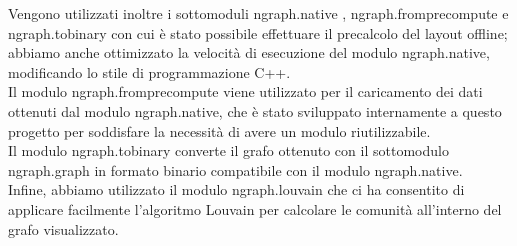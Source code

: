 Vengono utilizzati inoltre i sottomoduli ngraph.native \cite{ngraph.native}, ngraph.fromprecompute \cite{ngraph.fromprecompute} e ngraph.tobinary \cite{ngraph.tobinary} con cui è stato possibile effettuare il precalcolo del layout offline; abbiamo anche ottimizzato la velocità di esecuzione del modulo ngraph.native, modificando lo stile di programmazione C++.\\
Il modulo ngraph.fromprecompute viene utilizzato per il caricamento dei dati ottenuti dal modulo ngraph.native, che è stato  sviluppato internamente a questo progetto per soddisfare  la necessità di avere un modulo riutilizzabile.\\
Il modulo ngraph.tobinary converte il grafo ottenuto con il sottomodulo ngraph.graph in formato binario compatibile con il modulo ngraph.native.\\
Infine, abbiamo utilizzato il modulo ngraph.louvain \cite{ngraph.tobinary} che ci ha consentito di applicare facilmente l'algoritmo Louvain per calcolare le comunità all'interno del grafo visualizzato.

